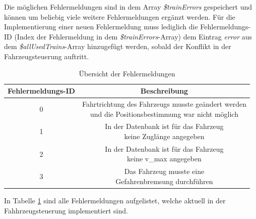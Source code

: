 Die möglichen Fehlermeldungen sind in dem Array \textit{\$trainErrors} gespeichert und können um beliebig viele weitere Fehlermeldungen ergänzt werden. Für die Implementierung einer neuen Fehlermeldung muss lediglich die Fehlermeldungs-ID (Index der Fehlermeldung in dem \textit{\$trainErrors}-Array) dem Eintrag \textit{error} aus dem \textit{\$allUsedTrains}-Array hinzugefügt werden, sobald der Konflikt in der Fahrzeugsteuerung auftritt.
\begin{table}
\begin{center}
\renewcommand{\arraystretch}{1.2}
\begin{tabular}{c|c}
Fehlermeldungs-ID & Beschreibung  \\ \hline
0 &    \makecell{Fahrtrichtung des Fahrzeugs musste geändert werden\\und die Positionsbestimmung war nicht möglich} \\\hline
1              &    \makecell{In der Datenbank ist für das Fahrzeug\\keine Zuglänge angegeben}             \\ \hline
2         &    \makecell{In der Datenbank ist für das Fahrzeug\\keine v\_max angegeben}             \\ \hline
3        &   \makecell{Das Fahrzeug musste eine\\Gefahrenbremsung durchführen}          \\ 
\end{tabular}
\renewcommand{\arraystretch}{1}
\caption{Übersicht der Fehlermeldungen}
\label{table:fehlertabelle}
\end{center}
\end{table}
In Tabelle \ref{table:fehlertabelle} sind alle Fehlermeldungen aufgelistet, welche aktuell in der Fahhrzeugsteuerung implementiert sind.







































